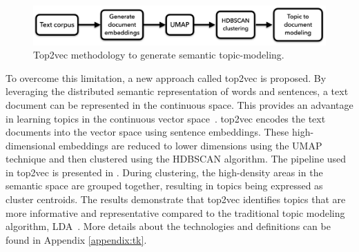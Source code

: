 \begin{figure}[h]
	\centering
	\includegraphics[width=.99\textwidth]{images/thesis_images/top2vec.png}
	\caption[Top2vec topic modeling.]{Top2vec methodology to generate semantic topic-modeling.   \label{fig:top2vec}}
\end{figure}

To overcome this limitation, a new approach called top2vec is proposed. By leveraging the distributed semantic representation of words and sentences, a text document can be represented in the continuous space. This provides an advantage in learning topics in the continuous vector space~\cite{angelov2020top2vec}. top2vec encodes the text documents into the vector space using sentence embeddings. These high-dimensional embeddings are reduced to lower dimensions using the \ac{UMAP} technique and then clustered using the \ac{HDBSCAN} algorithm. The pipeline used in top2vec is presented in . During clustering, the high-density areas in the semantic space are grouped together, resulting in topics being expressed as cluster centroids. The results demonstrate that top2vec identifies topics that are more informative and representative compared to the traditional topic modeling algorithm, \ac{LDA}~\cite{angelov2020top2vec}. More details about the technologies and definitions can be found in Appendix \ref{appendix:tk}.








